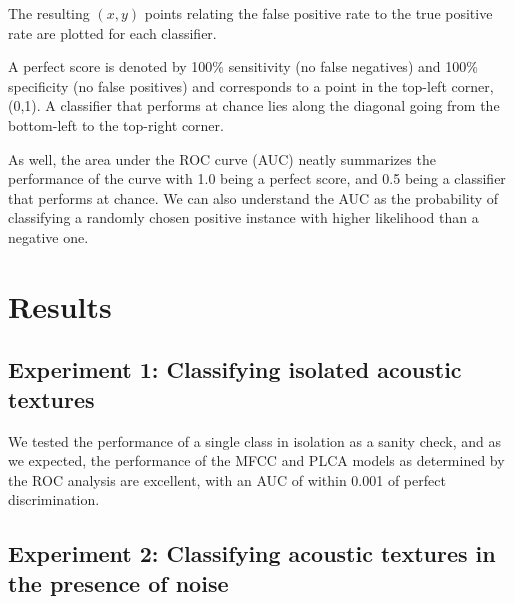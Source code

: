 \documentclass[a4paper,11pt,final]{ThesisStyle}
\begin{document}
The resulting $(x,y)$ points relating the false positive rate to the true positive rate are plotted for each classifier.

A perfect score is denoted by 100\% sensitivity (no false negatives) and 100\% specificity (no false positives) and corresponds to a point in the top-left corner, (0,1).  A classifier that performs at chance lies along the diagonal going from the bottom-left to the top-right corner.  

As well, the area under the ROC curve (AUC) neatly summarizes the performance of the curve with 1.0 being a perfect score, and 0.5 being a classifier that performs at chance.  We can also understand the AUC as the probability of classifying a randomly chosen positive instance with higher likelihood than a negative one.

\section{Results}

\subsection*{Experiment 1: Classifying isolated acoustic textures}

We tested the performance of a single class in isolation as a sanity check, and as we expected, the performance of the MFCC and PLCA models as determined by the ROC analysis are excellent, with an AUC of within 0.001 of perfect discrimination.




\subsection*{Experiment 2: Classifying acoustic textures in the presence of noise}
\end{document}
